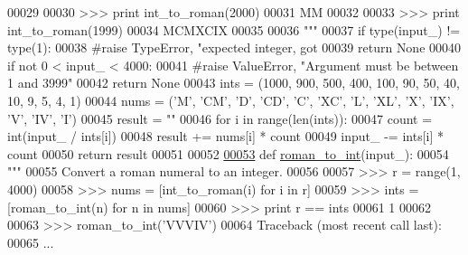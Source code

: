 \begin{DoxyCode}
00029 \textcolor{stringliteral}{    }
00030 \textcolor{stringliteral}{    >>> print int\_to\_roman(2000)}
00031 \textcolor{stringliteral}{    MM}
00032 \textcolor{stringliteral}{}
00033 \textcolor{stringliteral}{    >>> print int\_to\_roman(1999)}
00034 \textcolor{stringliteral}{    MCMXCIX}
00035 \textcolor{stringliteral}{}
00036 \textcolor{stringliteral}{    """}
00037     \textcolor{keywordflow}{if} type(input\_) != type(1):
00038         \textcolor{comment}{#raise TypeError, "expected integer, got %
00039         \textcolor{keywordflow}{return} \textcolor{keywordtype}{None}
00040     \textcolor{keywordflow}{if} \textcolor{keywordflow}{not} 0 < input\_ < 4000:
00041         \textcolor{comment}{#raise ValueError, "Argument must be between 1 and 3999"}
00042         \textcolor{keywordflow}{return} \textcolor{keywordtype}{None}
00043     ints = (1000, 900, 500, 400, 100, 90, 50, 40, 10, 9, 5, 4, 1)
00044     nums = (\textcolor{stringliteral}{'M'}, \textcolor{stringliteral}{'CM'}, \textcolor{stringliteral}{'D'}, \textcolor{stringliteral}{'CD'}, \textcolor{stringliteral}{'C'}, \textcolor{stringliteral}{'XC'}, \textcolor{stringliteral}{'L'}, \textcolor{stringliteral}{'XL'}, \textcolor{stringliteral}{'X'}, \textcolor{stringliteral}{'IX'}, \textcolor{stringliteral}{'V'}, \textcolor{stringliteral}{'IV'}, \textcolor{stringliteral}{'I'})
00045     result = \textcolor{stringliteral}{""}
00046     \textcolor{keywordflow}{for} i \textcolor{keywordflow}{in} range(len(ints)):
00047         count = int(input\_ / ints[i])
00048         result += nums[i] * count
00049         input\_ -= ints[i] * count
00050     \textcolor{keywordflow}{return} result
00051 
00052 
\hypertarget{misc_8py_source_l00053}{}\hyperlink{namespacepyneb_1_1utils_1_1misc_a97329c3ce57bd870421672b90e3e6541}{00053} \textcolor{keyword}{def }\hyperlink{namespacepyneb_1_1utils_1_1misc_a97329c3ce57bd870421672b90e3e6541}{roman\_to\_int}(input\_):
00054     \textcolor{stringliteral}{"""}
00055 \textcolor{stringliteral}{    Convert a roman numeral to an integer.}
00056 \textcolor{stringliteral}{    }
00057 \textcolor{stringliteral}{    >>> r = range(1, 4000)}
00058 \textcolor{stringliteral}{    >>> nums = [int\_to\_roman(i) for i in r]}
00059 \textcolor{stringliteral}{    >>> ints = [roman\_to\_int(n) for n in nums]}
00060 \textcolor{stringliteral}{    >>> print r == ints}
00061 \textcolor{stringliteral}{    1}
00062 \textcolor{stringliteral}{    }
00063 \textcolor{stringliteral}{    >>> roman\_to\_int('VVVIV')}
00064 \textcolor{stringliteral}{    Traceback (most recent call last):}
00065 \textcolor{stringliteral}{     ...}
}
\end{DoxyCode}
